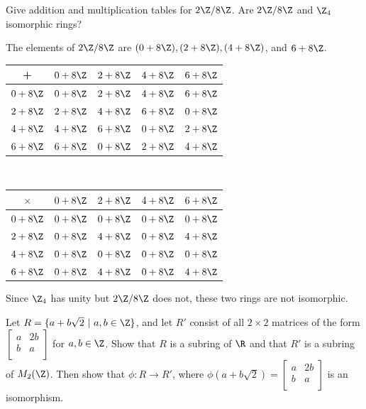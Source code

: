 \begin{problem}[30.4]
  Give addition and multiplication tables for $2\Z/8\Z$. Are $2\Z/8\Z$ and $\Z_4$ isomorphic rings?
\end{problem}

\begin{solution}
  The elements of $2\Z/8\Z$ are $(0 + 8\Z), (2 + 8\Z), (4 + 8\Z)$, and $6+ 8\Z$.

  \begin{center}
    \begin{tabular}{c|cccc}
      + & $0 + 8\Z$ & $2 + 8\Z$ & $4 + 8\Z$ & $6 + 8\Z$ \\
      \hline\hline
      $0 + 8\Z$ & $0 + 8\Z$ & $2 + 8\Z$ & $4 + 8\Z$ & $6 + 8\Z$ \\
      \hline
      $2 + 8\Z$ & $2 + 8\Z$ & $4 + 8\Z$ & $6 + 8\Z$ & $0 + 8\Z$ \\
      \hline
      $4 + 8\Z$ & $4 + 8\Z$ & $6 + 8\Z$ & $0 + 8\Z$ & $2 + 8\Z$ \\
      \hline
      $6 + 8\Z$ & $6 + 8\Z$ & $0 + 8\Z$ & $2 + 8\Z$ & $4 + 8\Z$ \\
      \hline
    \end{tabular}
    $\quad$
    \begin{tabular}{c|cccc}
      $\times$ & $0 + 8\Z$ & $2 + 8\Z$ & $4 + 8\Z$ & $6 + 8\Z$ \\
      \hline\hline
      $0 + 8\Z$ & $0 + 8\Z$ & $0 + 8\Z$ & $0 + 8\Z$ & $0 + 8\Z$ \\
      \hline
      $2 + 8\Z$ & $0 + 8\Z$ & $4 + 8\Z$ & $0 + 8\Z$ & $4 + 8\Z$ \\
      \hline
      $4 + 8\Z$ & $0 + 8\Z$ & $0 + 8\Z$ & $0 + 8\Z$ & $0 + 8\Z$ \\
      \hline
      $6 + 8\Z$ & $0 + 8\Z$ & $4 + 8\Z$ & $0 + 8\Z$ & $4 + 8\Z$ \\
      \hline
    \end{tabular}
  \end{center}

  \noindent Since $\Z_4$ has unity but $2\Z/8\Z$ does not, these two rings are not isomorphic.
\end{solution}

\begin{problem}[30.17]
  Let $R = \{a + b\sqrt{2}~|~a, b \in \Z\}$, and let $R'$ consist of all $2 \times 2$ matrices of the form $\begin{bmatrix}
    a & 2b \\
    b & a \\
    \end{bmatrix}$ for $a, b \in \Z$. Show that $R$ is a subring of $\R$ and that $R'$ is a subring of $M_2(\Z)$. Then show that $\phi : R \to R'$, where $\phi(a + b\sqrt{2}) = \begin{bmatrix}
    a & 2b \\
    b & a \\
  \end{bmatrix}$ is an isomorphism.
\end{problem}

